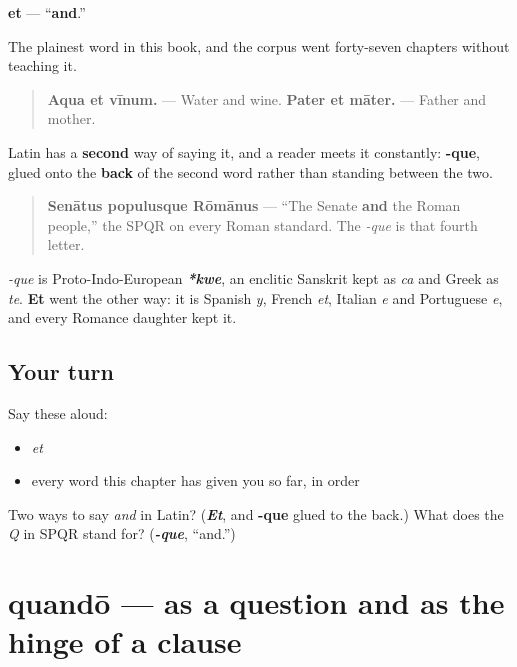 \begin{cousinweb}
\textbf{et} — \textquotedblleft{}\textbf{and}.\textquotedblright{}

The plainest word in this book, and the corpus went forty-seven chapters without teaching it.

\begin{quote}
\textbf{Aqua et vīnum.} — Water and wine. \textbf{Pater et māter.} — Father and mother.
\end{quote}

Latin has a \textbf{second} way of saying it, and a reader meets it constantly: \textbf{-que}, glued onto the \textbf{back} of the second word rather than standing between the two.

\begin{quote}
\textbf{Senātus populusque Rōmānus} — \textquotedblleft{}The Senate \textbf{and} the Roman people,\textquotedblright{} the SPQR on every Roman standard. The \emph{-que} is that fourth letter.
\end{quote}

\emph{-que} is Proto-Indo-European \emph{\textbf{*kwe}}, an enclitic Sanskrit kept as \emph{ca} and Greek as \emph{te}. \textbf{Et} went the other way: it is Spanish \emph{y}, French \emph{et}, Italian \emph{e} and Portuguese \emph{e}, and every Romance daughter kept it.
\end{cousinweb}

\subsection*{Your turn}
Say these aloud:

\begin{itemize}
\raggedright
  \item \emph{et}
  \item every word this chapter has given you so far, in order
\end{itemize}

\begin{tcolorbox}[breakable,colback=teal!4,colframe=teal!35!black,title={Before you move on}]
Two ways to say \emph{and} in Latin? (\emph{\textbf{Et}}, and \textbf{-que} glued to the back.) What does the \emph{Q} in SPQR stand for? (\emph{\textbf{-que}}, \textquotedblleft{}and.\textquotedblright{})
\end{tcolorbox}
\section[quandō]{quandō — as a question and as the hinge of a clause}

